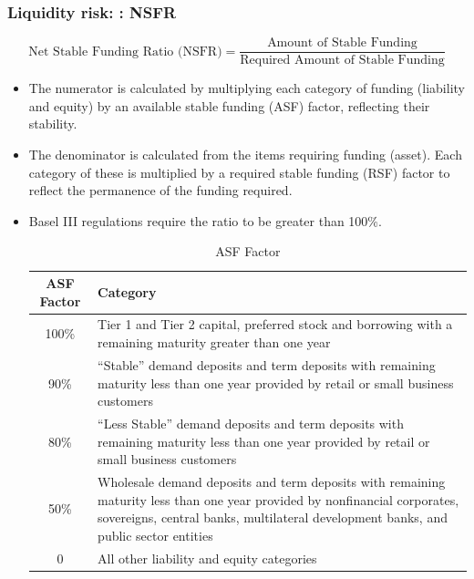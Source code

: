 \subsubsection{Liquidity risk: : NSFR}
    \begin{equation}
    \text{Net Stable Funding Ratio (NSFR)} = \frac{\text{Amount of Stable Funding}}{\text{Required Amount of Stable Funding}}
    \end{equation}
\begin{itemize}
\item The numerator is calculated by multiplying each category of funding (liability and equity) by an available stable funding (ASF) factor, reflecting their stability.
\item The denominator is calculated from the items requiring funding (asset). Each category of these is multiplied by a required stable funding (RSF) factor to reflect the permanence of the funding required.
\item Basel III regulations require the ratio to be greater than 100\%.

\begin{table}[H]
    \centering
    \caption{ASF Factor}
    \renewcommand{\arraystretch}{1.5} %
    \begin{tabular}{|c|p{14cm}|}
        \hline
        \textbf{ASF Factor} & \textbf{Category} \\
        \hline
        100\% & Tier 1 and Tier 2 capital, preferred stock and borrowing with a remaining maturity greater than one year \\
        \hline
        90\% & ``Stable'' demand deposits and term deposits with remaining maturity less than one year provided by retail or small business customers \\
        \hline
        80\% & ``Less Stable'' demand deposits and term deposits with remaining maturity less than one year provided by retail or small business customers \\
        \hline
        50\% & Wholesale demand deposits and term deposits with remaining maturity less than one year provided by nonfinancial corporates, sovereigns, central banks, multilateral development banks, and public sector entities \\
        \hline
        0 & All other liability and equity categories \\
        \hline
    \end{tabular}
\end{table}


\end{itemize}
